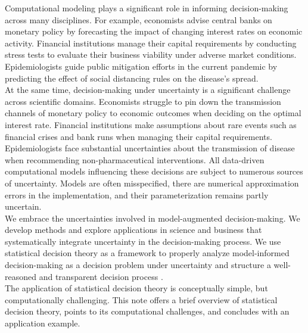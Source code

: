 
\vspace{-1.0cm} Computational modeling plays a significant role in informing decision-making across many disciplines. For example, economists advise central banks on monetary policy by forecasting the impact of changing interest rates on economic activity. Financial institutions manage their capital requirements by conducting stress tests to evaluate their business viability under adverse market conditions. Epidemiologists guide public mitigation efforts in the current pandemic by
predicting the effect of social distancing rules on the disease’s spread.\\

At the same time, decision-making under uncertainty is a significant challenge across scientific domains. Economists struggle to pin down the transmission channels of monetary policy to economic outcomes when deciding on the optimal interest rate. Financial institutions make assumptions about rare events such as financial crises and bank runs when managing their capital requirements. Epidemiologists face substantial uncertainties about the transmission of disease when recommending non-pharmaceutical interventions. All data-driven computational models influencing these decisions are subject to numerous sources of uncertainty. Models are often misspecified, there are numerical approximation errors in the implementation, and their parameterization remains partly uncertain.\\

We embrace the uncertainties involved in model-augmented decision-making. We develop methods and explore applications in science and business that systematically integrate uncertainty in the decision-making process. We use statistical decision theory as a framework to properly analyze model-informed decision-making as a decision problem under uncertainty and structure a well-reasoned and transparent decision process \citep{Blesch.2021, Eisenhauer.2021, Manski.2021}.\\

The application of statistical decision theory is conceptually simple, but computationally challenging. This note offers a brief overview of statistical decision theory, points to its computational challenges, and concludes with an application example.\newpage
